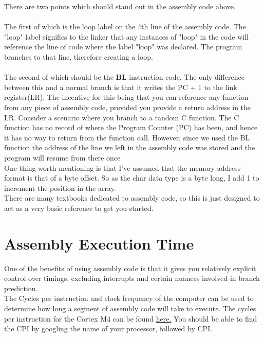 \documentclass[10pt]{article}
\begin{document}
There are two points which should stand out in the assembly code above. \\ \\ 
The first of which is the loop label on the 4th line of the assembly code. The "loop" label signifies to the linker that any instances of "loop" in the code will reference the line of code where the label "loop" was declared. The program branches to that line, therefore creating a loop. \\ \\
The second of which should be the \textbf{BL} instruction code. The only difference between this and a normal branch is that it writes the PC + 1 to the link register(LR). The incentive for this being that you can reference any function from any piece of assembly code, provided you provide a return address in the LR. Consider a scenario where you branch to a random C function. The C function has no record of where the Program Counter (PC) has been, and hence it has no way to return from the function call. However, since we used the BL function the address of the line we left in the assembly code was stored and the program will resume from there once \\

\* One thing worth mentioning is that I've assumed that the memory address format is that of a byte offset. So as the char data type is a byte long, I add 1 to increment the position in the array. \\

There are many textbooks dedicated to assembly code, so this is just designed to act as a very basic reference to get you started.

\section{Assembly Execution Time}
One of the benefits of using assembly code is that it gives you relatively explicit control over timings, excluding interrupts and certain nuances involved in branch prediction. \\

The Cycles per instruction and clock frequency of the computer can be used to determine how long a segment of assembly code will take to execute. The cycles per instruction for the Cortex M4 can be found \href{http://infocenter.arm.com/help/index.jsp?topic=/com.arm.doc.ddi0439b/CHDDIGAC.html}{here.} You should be able to find the CPI by googling the name of your processor, followed by CPI.
\end{document}
